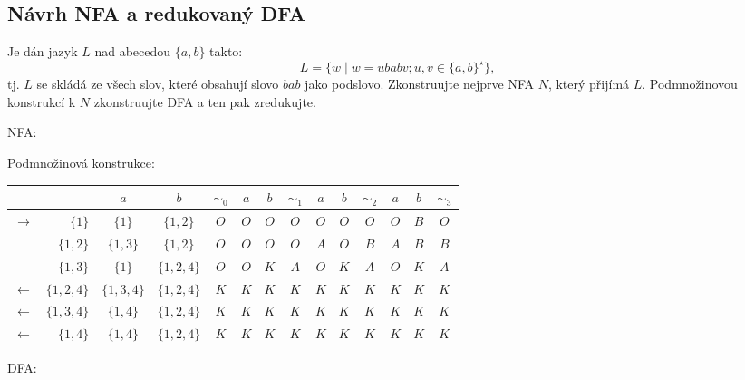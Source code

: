 \subsection{Návrh NFA a redukovaný DFA}
Je dán jazyk $L$ nad abecedou $\{a,b\}$ takto:
\[L = \{w \mid w = ubabv; u,v\in\{a,b\}^\star\}\text{,}\]
tj. $L$ se skládá ze všech slov, které obsahují slovo $bab$ jako podslovo. Zkonstruujte nejprve NFA $N$, který přijímá
$L$. Podmnožinovou konstrukcí k $N$ zkonstruujte DFA a ten pak zredukujte.

NFA:


Podmnožinová konstrukce:

\begin{tabular}{|r r|c c||c|c c||c|c c||c|c c||c|}
    \hline
    & & $a$ & $b$ & $ \sim_0 $ & $a$ & $b$ & $\sim_1$ & $a$ & $b$ & $\sim_2$ & $a$ & $b$ & $\sim_3$ \\ \hline \hline
              $\to$ & $\{1\}$ & $\{1\}$ & $\{1,2\}$ & $O$ & $O$ & $O$ & $O$ & $O$ & $O$ & $O$ & $O$ & $B$ & $O$ \\
                & $\{1,2\}$ & $\{1,3\}$ & $\{1,2\}$ & $O$ & $O$ & $O$ & $O$ & $A$ & $O$ & $B$ & $A$ & $B$ & $B$ \\
                & $\{1,3\}$ & $\{1\}$ & $\{1,2,4\}$ & $O$ & $O$ & $K$ & $A$ & $O$ & $K$ & $A$ & $O$ & $K$ & $A$ \\
    $\gets$&$\{1,2,4\}$ & $\{1,3,4\}$ & $\{1,2,4\}$ & $K$ & $K$ & $K$ & $K$ & $K$ & $K$ & $K$ & $K$ & $K$ & $K$ \\
    $\gets$ & $\{1,3,4\}$ & $\{1,4\}$ & $\{1,2,4\}$ & $K$ & $K$ & $K$ & $K$ & $K$ & $K$ & $K$ & $K$ & $K$ & $K$ \\
    $\gets$   & $\{1,4\}$ & $\{1,4\}$ & $\{1,2,4\}$ & $K$ & $K$ & $K$ & $K$ & $K$ & $K$ & $K$ & $K$ & $K$ & $K$ \\
    \hline
\end{tabular}

DFA:

